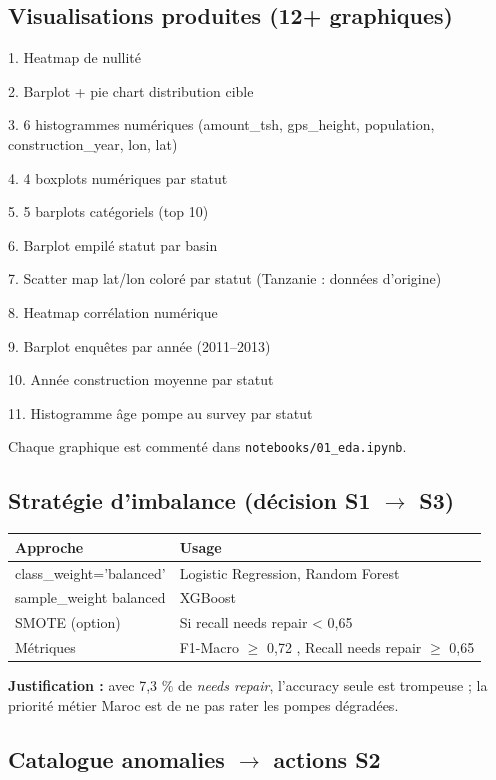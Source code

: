 \documentclass[11pt,a4paper]{report}
\begin{document}
\subsection{Visualisations produites (12+ graphiques)}

1. Heatmap de nullité

2. Barplot + pie chart distribution cible

3. 6 histogrammes numériques (amount\_tsh, gps\_height, population, construction\_year, lon, lat)

4. 4 boxplots numériques par statut

5. 5 barplots catégoriels (top 10)

6. Barplot empilé statut par basin

7. Scatter map lat/lon coloré par statut (Tanzanie : données d'origine)

8. Heatmap corrélation numérique

9. Barplot enquêtes par année (2011–2013)

10. Année construction moyenne par statut

11. Histogramme âge pompe au survey par statut

Chaque graphique est commenté dans \texttt{notebooks/01\_eda.ipynb}.

\subsection{Stratégie d'imbalance (décision S1 $\rightarrow$ S3)}

{\small
\begin{longtable}{@{}>{\raggedright\arraybackslash}p{}>{\raggedright\arraybackslash}p{}@{}}
\toprule
\rowcolor{EHTPTableHead}Approche & Usage \\
\midrule
class\_weight='balanced' & Logistic Regression, Random Forest \\
sample\_weight balanced & XGBoost \\
SMOTE (option) & Si recall needs repair < 0,65 \\
Métriques & F1-Macro $\geq$ 0,72 ,  Recall needs repair $\geq$ 0,65 \\
\bottomrule
\end{longtable}
}

\textbf{Justification :} avec 7,3 \% de \textit{needs repair}, l'accuracy seule est trompeuse ; la priorité métier Maroc est de ne pas rater les pompes dégradées.

\subsection{Catalogue anomalies $\rightarrow$ actions S2}
\end{document}
